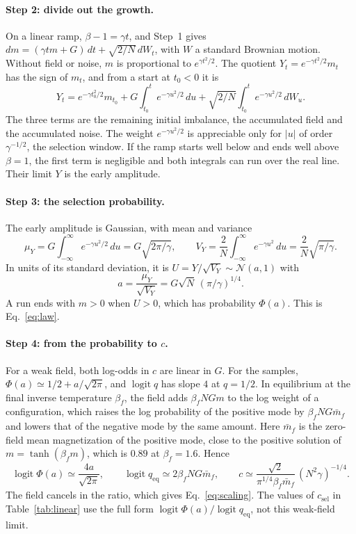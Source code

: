 \documentclass[final]{dynafront2026}
\newcommand{\qeq}{q_{\mathrm{eq}}}
\DeclareMathOperator{\logit}{logit}
\begin{document}
\paragraph{Step 2: divide out the growth.}
On a linear ramp, $\beta-1=\gamma t$, and Step~1 gives
$dm=(\gamma tm+G)\,dt+\sqrt{2/N}\,dW_t$, with $W$ a standard Brownian
motion. Without field or noise, $m$ is proportional to $e^{\gamma t^2/2}$. The quotient
$Y_t=e^{-\gamma t^2/2}m_t$ has the sign of $m_t$, and from a start at
$t_0<0$ it is
\[
 Y_t=e^{-\gamma t_0^2/2}m_{t_0}
       +G\int_{t_0}^t e^{-\gamma u^2/2}\,du
       +\sqrt{2/N}\int_{t_0}^t e^{-\gamma u^2/2}\,dW_u .
\]
The three terms are the remaining
initial imbalance, the accumulated field and the accumulated noise. The
weight $e^{-\gamma u^2/2}$ is appreciable only for $|u|$ of order
$\gamma^{-1/2}$, the selection window. If the ramp starts well below and
ends well above $\beta=1$, the first term is negligible and both integrals
can run over the real line. Their limit $Y$ is the early amplitude.

\paragraph{Step 3: the selection probability.}
The early amplitude is Gaussian, with mean and variance
\[
 \mu_Y=G\int_{-\infty}^{\infty}e^{-\gamma u^2/2}\,du=G\sqrt{2\pi/\gamma},
 \qquad
 V_Y=\frac2N\int_{-\infty}^{\infty}e^{-\gamma u^2}\,du
    =\frac2N\sqrt{\pi/\gamma}.
\]
In units of its standard deviation, it is $U=Y/\sqrt{V_Y}\sim\mathcal N(a,1)$
with
\[
 a=\frac{\mu_Y}{\sqrt{V_Y}}=G\sqrt N\,(\pi/\gamma)^{1/4}.
\]
A run ends with $m>0$ when $U>0$, which has probability $\Phi(a)$. This is
Eq.~\eqref{eq:law}.

\paragraph{Step 4: from the probability to $c$.}
For a weak field, both log-odds in $c$ are linear in $G$. For the samples,
$\Phi(a)\simeq1/2+a/\sqrt{2\pi}$, and $\logit q$ has slope $4$ at $q=1/2$. In
equilibrium at the final inverse temperature $\beta_f$, the field adds
$\beta_fNGm$ to the log weight of a configuration, which raises the log
probability of the positive mode by $\beta_fNG\bar m_f$ and lowers that of
the negative mode by the same amount. Here $\bar m_f$ is the zero-field mean
magnetization of the positive mode, close to the positive solution of
$m=\tanh(\beta_fm)$, which is $0.89$ at $\beta_f=1.6$. Hence
\[
 \logit\Phi(a)\simeq\frac{4a}{\sqrt{2\pi}},
 \qquad
 \logit\qeq\simeq2\beta_fNG\bar m_f,
 \qquad
 c\simeq\frac{\sqrt2}{\pi^{1/4}\beta_f\bar m_f}\,(N^2\gamma)^{-1/4}.
\]
The field cancels in the ratio, which gives Eq.~\eqref{eq:scaling}. The
values of $c_{\mathrm{sel}}$ in Table~\ref{tab:linear} use the full form
$\logit\Phi(a)/\logit\qeq$, not this weak-field limit.
\end{document}
